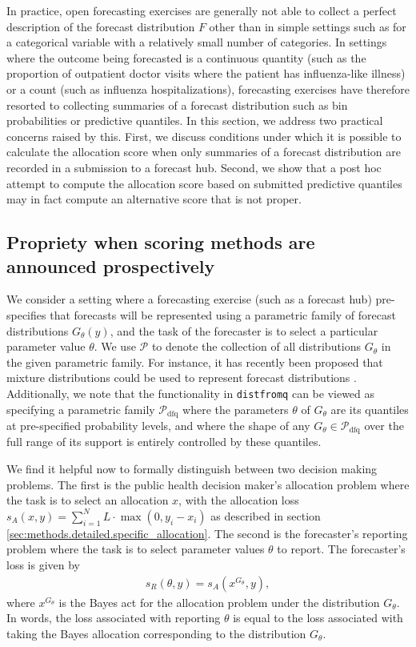 \documentclass{article}\usepackage[]{graphicx}\usepackage[]{xcolor}
\begin{document}
In practice, open forecasting exercises are generally not able to collect a perfect description of the forecast
distribution $F$ other than in simple settings such as for a categorical variable with a relatively small number of
categories. In settings where the outcome being forecasted is a continuous quantity (such as the proportion of
outpatient doctor visits where the patient has influenza-like illness) or a count (such as influenza hospitalizations),
forecasting exercises have therefore resorted to collecting summaries of a forecast distribution such as bin
probabilities or predictive quantiles. In this section, we address two practical concerns raised by this. First, we
discuss conditions under which it is possible to calculate the allocation score when only summaries of a forecast
distribution are recorded in a submission to a forecast hub. Second, we show that a post hoc attempt to compute the
allocation score based on submitted predictive quantiles may in fact compute an alternative score that is not proper.

\subsection{Propriety when scoring methods are announced prospectively}

We consider a setting where a forecasting exercise (such as a forecast hub) pre-specifies that forecasts will be
represented using a parametric family of forecast distributions $G_\theta(y)$, and the task of the forecaster is to
select a particular parameter value $\theta$. We use $\mathcal{P}$ to denote the collection of all distributions
$G_\theta$ in the given parametric family. For instance, it has recently been proposed that mixture distributions could
be used to represent forecast distributions \citep{wadsworth2023mixture}. Additionally, we note that the functionality
in \verb`distfromq` can be viewed as specifying a parametric family $\mathcal{P}_{\mathrm{dfq}}$ where the parameters
$\theta$ of $G_\theta$ are its quantiles at pre-specified probability levels, and where the shape of any $G_\theta \in
\mathcal{P}_{\mathrm{dfq}}$ over the full range of its support is entirely controlled by these quantiles.

We find it helpful now to formally distinguish between two decision making problems. The first is the public health
decision maker's allocation problem where the task is to select an allocation $x$, with the allocation loss $s_A(x, y) =
\sum_{i=1}^N L \cdot \max(0, y_i - x_i)$ as described in section \ref{sec:methods.detailed.specific_allocation}. The
second is the forecaster's reporting problem where the task is to select parameter values $\theta$ to report. The
forecaster's loss is given by
\begin{align}
s_R(\theta, y) = s_A(x^{G_\theta}, y), \label{eqn:forecaster_theta_loss}
\end{align}
where $x^{G_\theta}$ is the Bayes act for the allocation problem under the distribution $G_\theta$. In words, the loss
associated with reporting $\theta$ is equal to the loss associated with taking the Bayes allocation corresponding to the
distribution $G_\theta$.
\end{document}
